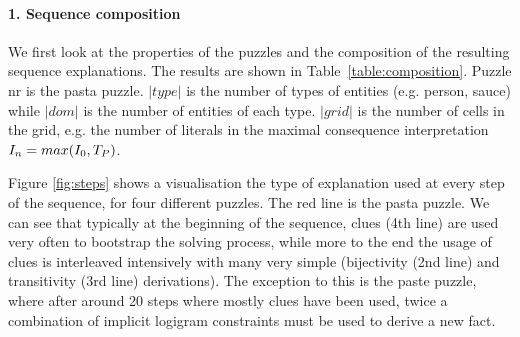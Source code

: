 \paragraph{1. Sequence composition}
We first look at the properties of the puzzles and the composition of the resulting sequence explanations. The results are shown in Table~\ref{table:composition}. Puzzle nr  is the pasta puzzle. $|type|$ is the number of types of entities (e.g. person, sauce) while $|dom|$ is the number of entities of each type. $|grid|$ is the number of cells in the grid, e.g. the number of literals in the maximal consequence interpretation $I_n=max(I_0,T_P)$.


Figure \ref{fig:steps} shows a visualisation the type of explanation used at every step of the sequence, for four different puzzles. The red line is the pasta puzzle. We can see that typically at the beginning of the sequence, clues (4th line)  are used very often to bootstrap the solving process, while more to the end the usage of clues is interleaved intensively with many very simple (bijectivity (2nd line) and transitivity (3rd line) derivations).
% 
The exception to this is the paste puzzle, where after around 20 steps where mostly clues have been used, twice a combination of implicit logigram constraints must be used to derive a new fact. %

